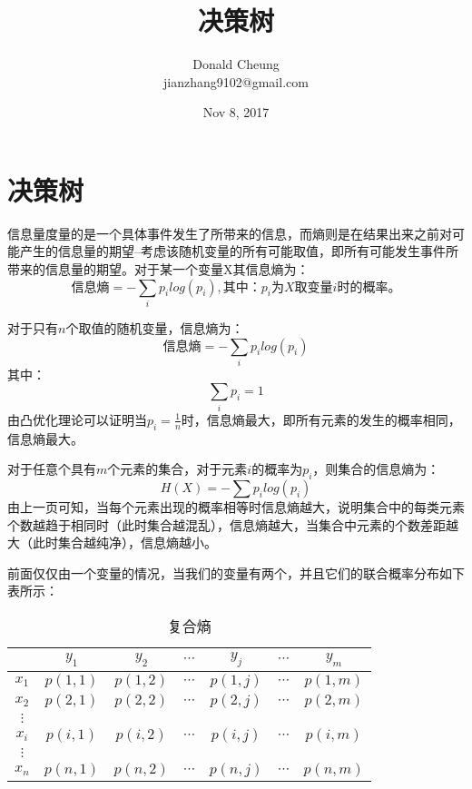 \documentclass[10pt,a4paper]{ctexbook}
\begin{document}
    \setlength{\baselineskip}{20pt}
    \title{决策树}
    \author{Donald Cheung\\jianzhang9102@gmail.com}
    \date{Nov 8, 2017}
    \tableofcontents
\fi

\chapter{决策树}


信息量度量的是一个具体事件发生了所带来的信息，而熵则是在结果出来之前对可能产生的信息量的期望--考虑该随机变量的所有可能取值，即所有可能发生事件所带来的信息量的期望。对于某一个变量X其信息熵为：
\[
信息熵= -\sum\limits_{i}{p_{i}log(p_{i})}, 其中：p_{i}为X取变量i时的概率。
\]

对于只有$n$个取值的随机变量，信息熵为：
\[
信息熵=-\sum\limits_{i}{p_{i}log(p_{i})}
\]
其中：
\[
\sum\limits_{i}{p_{i}}=1
\]
由凸优化理论可以证明当$p_{i}=\frac{1}{n}$时，信息熵最大，即所有元素的发生的概率相同，信息熵最大。


对于任意个具有$m$个元素的集合，对于元素$i$的概率为$p_{i}$，则集合的信息熵为：
\[
H(X)=-\sum{p_{i}log(p_{i})}
\]
由上一页可知，当每个元素出现的概率相等时信息熵越大，说明集合中的每类元素个数越趋于相同时（此时集合越混乱），信息熵越大，当集合中元素的个数差距越大（此时集合越纯净），信息熵越小。


前面仅仅由一个变量的情况，当我们的变量有两个，并且它们的联合概率分布如下表所示：
\begin{table}[H]
\centering
\begin{tabular}{|c|c|c|c|c|c|c|}
\hline
        & $y_{1}$ & $y_{2}$ & $\cdots$ & $y_{j}$ & $\cdots$ & $y_{m}$ \\
\hline
$x_{1}$ & $p(1,1)$ & $p(1,2)$ & $\cdots$ & $p(1,j)$ & $\cdots$ & $p(1,m)$ \\
\hline
$x_{2}$ & $p(2,1)$ & $p(2,2)$ & $\cdots$ & $p(2,j)$ & $\cdots$ & $p(2,m)$ \\
\hline
$\vdots$ & & & & & & \\
\hline
$x_{i}$ & $p(i,1)$ & $p(i,2)$ & $\cdots$ & $p(i,j)$ & $\cdots$ & $p(i,m)$ \\
\hline
$\vdots$ & & & & & & \\
\hline
$x_{n}$ & $p(n,1)$ & $p(n,2)$ & $\cdots$ & $p(n,j)$ & $\cdots$ & $p(n,m)$ \\
\hline
\end{tabular}%
\caption{复合熵}
\label{tab:complex-entropy}
\end{table}
\end{document}
